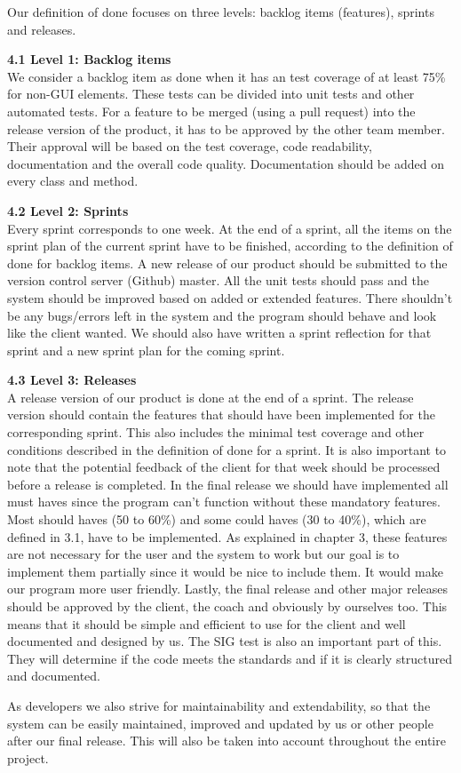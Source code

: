\documentclass[a4paper,english,fleqn]{exam}
\begin{document}
Our definition of done focuses on three levels: backlog items (features), sprints and releases.

\textbf{4.1 Level 1: Backlog items} \\
We consider a backlog item as done when it has an test coverage of at least 75\% for non-GUI elements. These tests can be divided into unit tests and other automated tests. For a feature to be merged (using a pull request) into the release version of the product, it has to be approved by the other team member. Their approval will be based on the test coverage, code readability, documentation and the overall code quality. Documentation should be added on every class and method. 

\textbf{4.2 Level 2: Sprints} \\
Every sprint corresponds to one week. At the end of a sprint, all the items on the sprint plan of the current sprint have to be finished, according to the definition of done for backlog items. A new release of our product should be submitted to the version control server (Github) master. All the unit tests should pass and the system should be improved based on added or extended features. There shouldn't be any bugs/errors left in the system and the program should behave and look like the client wanted. We should also have written a sprint reflection for that sprint and a new sprint plan for the coming sprint. 

\textbf{4.3 Level 3: Releases}\\
A release version of our product is done at the end of a sprint. The release version should contain the features that should have been implemented for the corresponding sprint. This also includes the minimal test coverage and other conditions described in the definition of done for a sprint. It is also important to note that the potential feedback of the client for that week should be processed before a release is completed.
In the final release we should have implemented all must haves since the program can't function without these mandatory features. Most should haves (50 to 60\%) and some could haves (30 to 40\%), which are defined in 3.1, have to be implemented. As explained in chapter 3, these features are not necessary for the user and the system to work but our goal is to implement them partially since it would be nice to include them. It would make our program more user friendly. 
Lastly, the final release and other major releases should be approved by the client, the coach and obviously by ourselves too. This means that it should be simple and efficient to use for the client and well documented and designed by us. The SIG test is also an important part of this. They will determine if the code meets the standards and if it is clearly structured and documented. 

As developers we also strive for maintainability and extendability, so that the system can be easily maintained, improved and updated by us or other people after our final release. This will also be taken into account throughout the entire project.
\end{document}
